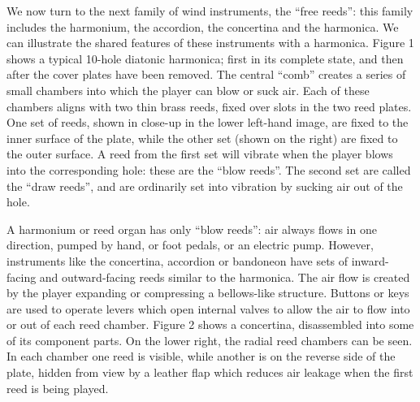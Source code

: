 

  We now turn to the next family of wind instruments, the ``free reeds'': this 
  family includes the harmonium, the accordion, the concertina and the 
  harmonica. We can illustrate the shared features of these instruments with a 
  harmonica. Figure 1 shows a typical 10-hole diatonic harmonica; first in its 
  complete state, and then after the cover plates have been removed. The 
  central “comb” creates a series of small chambers into which the player can 
  blow or suck air. Each of these chambers aligns with two thin brass reeds, 
  fixed over slots in the two reed plates. One set of reeds, shown in close-up 
  in the lower left-hand image, are fixed to the inner surface of the plate, 
  while the other set (shown on the right) are fixed to the outer surface. A 
  reed from the first set will vibrate when the player blows into the 
  corresponding hole: these are the “blow reeds”. The second set are called the 
  “draw reeds”, and are ordinarily set into vibration by sucking air out of the 
  hole. 





  A harmonium or reed organ has only “blow reeds”: air always flows in one 
  direction, pumped by hand, or foot pedals, or an electric pump. However, 
  instruments like the concertina, accordion or bandoneon have sets of 
  inward-facing and outward-facing reeds similar to the harmonica. The air flow 
  is created by the player expanding or compressing a bellows-like structure. 
  Buttons or keys are used to operate levers which open internal valves to 
  allow the air to flow into or out of each reed chamber. Figure 2 shows a 
  concertina, disassembled into some of its component parts. On the lower 
  right, the radial reed chambers can be seen. In each chamber one reed is 
  visible, while another is on the reverse side of the plate, hidden from view 
  by a leather flap which reduces air leakage when the first reed is being 
  played. 


